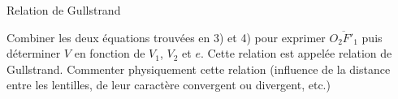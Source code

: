 \begin{exo}[MPSI]{Relation de Gullstrand}
\begin{quest}

	\item Combiner les deux équations trouvées en 3) et 4) pour exprimer $\overline{O_2 F'_1}$ puis déterminer $V$ en fonction de $V_1$, $V_2$ et $e$.  Cette relation est appelée relation de Gullstrand. Commenter physiquement cette relation (influence de la distance entre les lentilles, de leur caractère convergent ou divergent, etc.)


\end{quest}
\end{exo}

